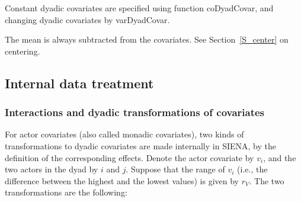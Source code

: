 \documentclass[a4paper,fleqn,11pt]{article}
\newcommand{\+}{\, + \,}
\newcommand{\sfn}[1]{\textsf{#1}}
\newcommand{\si}{{\sf SIENA}}
\begin{document}
Constant dyadic covariates are specified using function
\sfn{coDyadCovar}, and changing dyadic covariates by \sfn{varDyadCovar}.

The mean is always subtracted from the covariates.
See Section~\ref{S_center} on centering.

\subsection{Internal data treatment}
\label{S_internal}

\subsubsection{Interactions and dyadic transformations of covariates}

For actor covariates (also called monadic covariates),
two kinds of transformations to dyadic covariates
are made internally in \si, by the definition of the
corresponding effects. Denote the actor covariate by $v_i$,
and the two actors in the dyad by $i$ and $j$.
Suppose that the range of $v_i$ (i.e., the difference between the
highest and the lowest values) is given by $r_V$.
The two transformations are the following:
\end{document}

